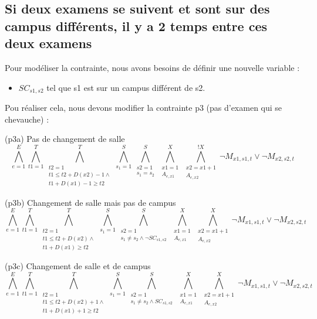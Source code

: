 \documentclass[a4paper,11pt]{article}
\begin{document}
\subsection{Si deux examens se suivent et sont sur des campus différents, il y a 2 temps entre ces deux examens}
Pour modéliser la contrainte, nous avons besoins de définir une nouvelle variable :  
\begin{itemize}
	\item \( SC_{s1,s2}\) tel que s1 est sur un campus différent de s2.
\end{itemize}
Pou réaliser cela, nous devons modifier la contrainte p3 (pas d'examen qui se chevauche) : 

(p3a) Pas de changement de salle
\begin{displaymath}
\bigwedge\limits_{e=1}^{E}\bigwedge\limits_{t1=1}^{T}\bigwedge\limits_{\substack{t2=1 \\ t1 \leq t2 + D(x2)-1 \wedge \\ t1 + D(x1)-1 \geq t2}}^{T}\bigwedge\limits_{s_{1}=1}^{S}\bigwedge\limits_{\substack{s2=1 \\ s_{1} = s_{2}}}^{S}\bigwedge\limits_{\substack{x1=1 \\ A_{e,x1}}}^{X}\bigwedge\limits_{\substack{x2=x1+1 \\ A_{e,x2}}}^{!X} \neg M_{x1, s1, t} \vee \neg M_{x2, s2, t}
\end{displaymath}

(p3b) Changement de salle mais pas de campus
\begin{displaymath}
\bigwedge\limits_{e=1}^{E}\bigwedge\limits_{t1=1}^{T}\bigwedge\limits_{\substack{t2=1 \\ t1 \leq t2 + D(x2) \wedge \\ t1 + D(x1) \geq t2}}^{T}\bigwedge\limits_{s_{1}=1}^{S}\bigwedge\limits_{\substack{s2=1 \\ s_{1} \neq s_{2} \wedge \neg SC_{s1,s2} }}^{S}\bigwedge\limits_{\substack{x1=1 \\ A_{e,x1}}}^{X}\bigwedge\limits_{\substack{x2=x1+1 \\ A_{e,x2}}}^{X} \neg M_{x1, s1, t} \vee \neg M_{x2, s2, t}
\end{displaymath}

(p3c) Changement de salle et de campus
\begin{displaymath}
\bigwedge\limits_{e=1}^{E}\bigwedge\limits_{t1=1}^{T}\bigwedge\limits_{\substack{t2=1 \\ t1 \leq t2 + D(x2) +1 \wedge \\ t1 + D(x1) +1 \geq t2}}^{T}\bigwedge\limits_{s_{1}=1}^{S}\bigwedge\limits_{\substack{s2=1 \\ s_{1} \neq s_{2} \wedge SC_{s1,s2}}}^{S}\bigwedge\limits_{\substack{x1=1 \\ A_{e,x1}}}^{X}\bigwedge\limits_{\substack{x2=x1+1 \\ A_{e,x2}}}^{X} \neg M_{x1, s1, t} \vee \neg M_{x2, s2, t}
\end{displaymath}
\end{document}

